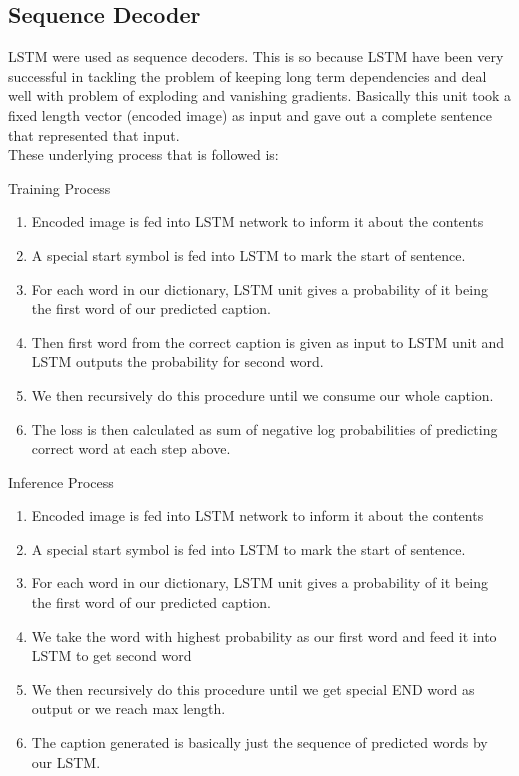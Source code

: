 \documentclass[11pt]{article}
\begin{document}
		\subsection{Sequence Decoder}
			LSTM were used as sequence decoders. This is so because LSTM have been very successful in tackling the problem of keeping long term dependencies and deal well with problem of exploding and vanishing gradients. Basically this unit took a fixed length vector (encoded image) as input and gave out a complete sentence that represented that input.\\
			These underlying process that is followed is:
			\begin{subsubsection}{Training Process}
				\begin{enumerate}
				\item Encoded image is fed into LSTM network to inform it about the contents
				\item A special start symbol is fed into LSTM to mark the start of sentence.
				\item For each word in our dictionary, LSTM unit gives a probability of it being the first word of our predicted caption.
				\item Then first word from the correct caption is given as input to LSTM unit and LSTM outputs the probability for second word.
				\item We then recursively do this procedure until we consume our whole caption.
				\item The loss is then calculated as sum of negative log probabilities of predicting correct word at each step above.
				\end{enumerate}
			\end{subsubsection}
			\begin{subsubsection}{Inference Process}
				\begin{enumerate}
				\item Encoded image is fed into LSTM network to inform it about the contents
				\item A special start symbol is fed into LSTM to mark the start of sentence.
				\item For each word in our dictionary, LSTM unit gives a probability of it being the first word of our predicted caption.
				\item We take the word with highest probability as our first word and feed it into LSTM to get second word
				\item We then recursively do this procedure until we get special END word as output or we reach max length.
				\item The caption generated is basically just the sequence of predicted words by our LSTM.
				\end{enumerate}
			\end{subsubsection}
\end{document}
